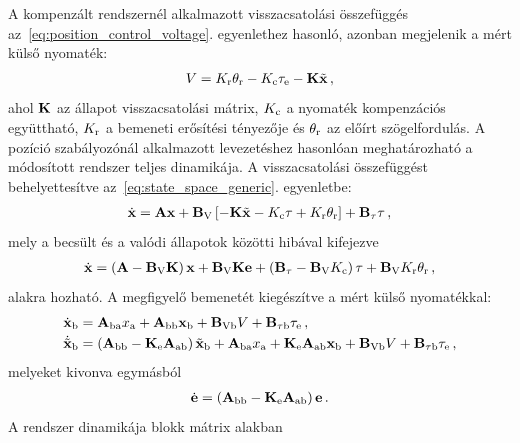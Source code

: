 A kompenzált rendszernél alkalmazott visszacsatolási összefüggés az~\eqref{eq:position_control_voltage}. egyenlethez
hasonló, azonban megjelenik a mért külső nyomaték:
\begin{align}
    V = K_{\mathrm{r}} \theta_{\mathrm{r}} - K_{\mathrm{c}} \tau_{\mathrm{e}} - \mathbf{K} \tilde{\mathbf{x}}\,,
\end{align}
ahol $\mathbf{K}$ az állapot visszacsatolási mátrix, $K_{\mathrm{c}}$ a nyomaték kompenzációs együttható,
$K_{\mathrm{r}}$ a bemeneti erősítési tényezője és $\theta_{\mathrm{r}}$ az előírt szögelfordulás.
A pozíció szabályozónál alkalmazott levezetéshez hasonlóan meghatározható a módosított rendszer teljes dinamikája.
A visszacsatolási összefüggést behelyettesítve az~\eqref{eq:state_space_generic}. egyenletbe:
\begin{align}\label{eq:state_control_law_subs}
    \dot{\mathbf{x}} = \mathbf{A} \mathbf{x} + \mathbf{B}_{\mathrm{V}}\left[-\mathbf{K} \tilde{\mathbf{x}} -K_{\mathrm{c}} \tau + K_{\mathrm{r}} \theta_{\mathrm{r}}\right] + \mathbf{B}_{\mathrm{\tau}} \tau\,,
\end{align}
mely a becsült és a valódi állapotok közötti hibával kifejezve 
\begin{align}
    \dot{\mathbf{x}} = \left(\mathbf{A} - \mathbf{B}_{\mathrm{V}} \mathbf{K}\right) \mathbf{x} + 
    \mathbf{B}_{\mathrm{V}} \mathbf{K} \mathbf{e} + 
    \left(\mathbf{B}_{\mathrm{\tau}} - \mathbf{B}_{\mathrm{V}} K_{\mathrm{c}}\right) \tau + 
    \mathbf{B}_{\mathrm{V}} K_{\mathrm{r}} \theta_{\mathrm{r}}\,,
\end{align}
alakra hozható. A megfigyelő bemenetét kiegészítve a mért külső nyomatékkal:
\begin{equation}
    \begin{split}
    \dot{\mathbf{x}}_{\mathrm{b}} &= \mathbf{A}_{\mathrm{ba}} x_{\mathrm{a}} + \mathbf{A}_{\mathrm{bb}} \mathbf{x}_{\mathrm{b}} + 
    \mathbf{B}_{\mathrm{Vb}} V + \mathbf{B}_{\mathrm{\tau b}} \tau_{\mathrm{e}}\,,\\
    \dot{\tilde{\mathbf{x}}}_{\mathrm{b}} &= \left(\mathbf{A}_{\mathrm{bb}} - \mathbf{K}_{\mathrm{e}} \mathbf{A}_{\mathrm{ab}}\right) \tilde{\mathbf{x}}_{\mathrm{b}} +
    \mathbf{A}_{\mathrm{ba}} x_{\mathrm{a}} +
    \mathbf{K}_{\mathrm{e}} \mathbf{A}_{\mathrm{ab}} \mathbf{x}_{\mathrm{b}} +
    \mathbf{B}_{\mathrm{Vb}} V + \mathbf{B}_{\mathrm{\tau b}} \tau_{\mathrm{e}}\,,
    \end{split}
\end{equation}
melyeket kivonva egymásból
\begin{align}
    \dot{\mathbf{e}} = \left(\mathbf{A}_{\mathrm{bb}} - \mathbf{K}_{\mathrm{e}} \mathbf{A}_{\mathrm{ab}}\right) \mathbf{e}\,.
\end{align}
A rendszer dinamikája blokk mátrix alakban
